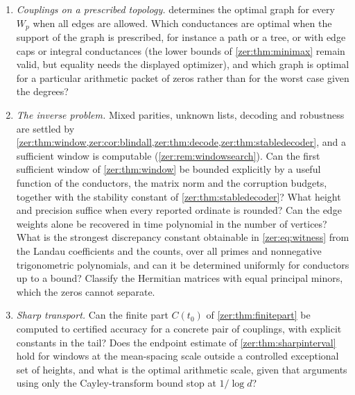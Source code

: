\begin{enumerate}
\item \emph{Couplings on a prescribed topology.}  determines the optimal graph
for every $W_p$ when all edges are allowed. Which conductances are optimal when the support of the
graph is prescribed, for instance a path or a tree, or with edge caps or integral conductances (the
lower bounds of \cref{zer:thm:minimax} remain valid, but equality needs the displayed optimizer), and
which graph is optimal for a particular
arithmetic packet of zeros rather than for the worst case given the degrees?
\item \emph{The inverse problem.} Mixed parities, unknown lists, decoding and robustness are settled by
\cref{zer:thm:window,zer:cor:blindall,zer:thm:decode,zer:thm:stabledecoder}, and a sufficient window is
computable (\cref{zer:rem:windowsearch}). Can the first sufficient window of \cref{zer:thm:window} be bounded
explicitly by a useful function of the conductors, the matrix norm and the corruption budgets, together with
the stability constant of \cref{zer:thm:stabledecoder}? What height and precision suffice when every reported
ordinate is rounded? Can the edge weights alone be recovered in time polynomial in the number of vertices?
What is the strongest discrepancy constant obtainable in \eqref{zer:eq:witness} from the Landau coefficients
and the counts, over all primes and nonnegative trigonometric polynomials, and can it be determined uniformly
for conductors up to a bound? Classify the Hermitian matrices with equal principal minors, which the zeros
cannot separate.
\item \emph{Sharp transport.} Can the finite part $C(t_0)$ of \cref{zer:thm:finitepart} be computed to
certified accuracy for a concrete pair of couplings, with explicit constants in the tail? Does the endpoint
estimate of \cref{zer:thm:sharpinterval} hold for windows at the mean-spacing scale outside a controlled
exceptional set of heights, and what is the optimal arithmetic scale, given that arguments using only the
Cayley-transform bound stop at $1/\log d$?
\end{enumerate}
